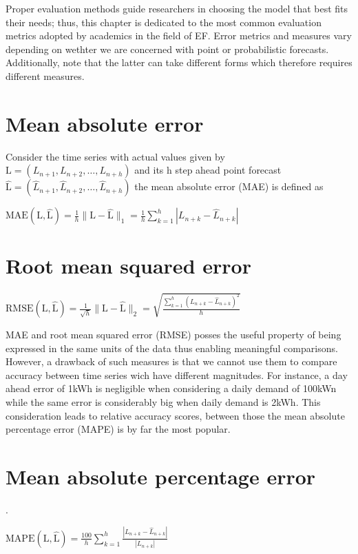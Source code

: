 Proper evaluation methods guide researchers in choosing the model that best fits their needs; thus, this chapter is dedicated to the most common evaluation metrics adopted by academics in the field of EF. Error metrics and measures vary depending on wethter we are concerned with point or probabilistic forecasts. Additionally, note that the latter can take different forms which therefore requires different measures.
\section{Mean absolute error}\label{mae}
Consider the time series with actual values given by $\mathrm{L}=(L_{n+1}, L_{n+2},\dots, L_{n+h})$
and its h step ahead point forecast $\mathrm{\hat{L}}=(\hat{L}_{n+1}, \hat{L}_{n+2},\dots, \hat{L}_{n+h})$ the mean absolute error (MAE) is defined as
\begin{definition}
    $\mathrm{MAE}(\mathrm{L},\mathrm{\hat{L}})=\frac{1}{h}\|\mathrm{L}-\mathrm{\hat{L}}\|_{1}=\frac{1}{h}\sum\limits_{k=1}^{h}|L_{n+k}-\hat{L}_{n+k}|$
\end{definition}

\section{Root mean squared error}\label{rmse}
\begin{definition}
    $\mathrm{RMSE(\mathrm{L}, \mathrm{\hat{L}})}=\frac{1}{\sqrt{h}}\|\mathrm{L}-\mathrm{\hat{L}}\|_{2}=\sqrt{\frac{\sum\limits_{k=1}^{h}(L_{n+k}- \hat{L}_{n+k})^2}{h}}$
\end{definition}

MAE and root mean squared error (RMSE) posses the useful property of being expressed in the same units of the data thus enabling meaningful comparisons.
However, a drawback of such measures is that we cannot use them to compare accuracy between time series wich have different magnitudes. For instance, a day ahead error of 1kWh is negligible when considering a daily demand of 100kWn while the same error is considerably big when daily demand is 2kWh. This consideration leads to relative accuracy scores, between those the mean absolute percentage error (MAPE) is by far the most popular.


\section{Mean absolute percentage error}\label{mape}. 
\begin{definition}
    $\mathrm{MAPE}(\mathrm{L},\mathrm{\hat{L}})=\frac{100}{h}\sum\limits_{k=1}^{h}\frac{|L_{n+k}-\hat{L}_{n+k}|}{|L_{n+k}|}$
\end{definition}

